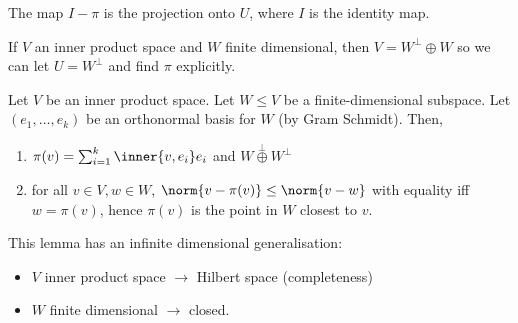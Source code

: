 \begin{remark}
	The map $I - \pi$ is the projection onto $U$, where $I$ is the identity map.
\end{remark}

\begin{remark}
	If $V$ an inner product space and $W$ finite dimensional, then $V = W^\perp \oplus W$ so we can let $U = W^\perp$ and find $\pi$ explicitly.
\end{remark} 

\begin{lemma}
	Let $V$ be an inner product space.
	Let $W \leq V$ be a finite-dimensional subspace.
	Let $(e_1, \dots, e_k)$ be an orthonormal basis for $W$ (by Gram Schmidt).
	Then,
	\begin{enumerate}
		\item $\pi(v) = \sum_{i=1}^k \inner{v, e_i} e_i$ and $W \overset{\perp}{\oplus} W^\perp$
		\item for all $v \in V, w \in W$, $\norm{v - \pi(v)} \leq \norm{v - w}$ with equality iff $w = \pi(v)$, hence $\pi(v)$ is the point in $W$ closest to $v$.
	\end{enumerate}
\end{lemma}

\begin{remark}
	This lemma has an infinite dimensional generalisation:
	\begin{itemize}
		\item $V$ inner product space $\to$ Hilbert space (completeness)
		\item $W$ finite dimensional $\to$ closed.
	\end{itemize} 
\end{remark} 

